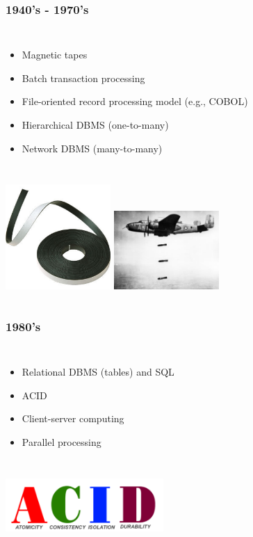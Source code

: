 \documentclass{beamer}
\begin{document}
\begin{frame}
\frametitle{1940's - 1970's}
\begin{columns}[c] 
\column{30em}
\begin{itemize}
  \justifying
  \item Magnetic tapes
  \item Batch transaction processing
  \item File-oriented record processing model (e.g., COBOL)
  \item Hierarchical DBMS (one-to-many)
  \item Network DBMS (many-to-many)
\end{itemize}
\end{columns}
\vspace{0.75cm}
\begin{columns}[c] 
\includegraphics[width=4cm]{figs/tape.pdf}
\hspace*{1cm}\includegraphics[width=4cm]{figs/bombers.pdf}
\end{columns}
\end{frame}

\begin{frame}
\frametitle{1980's}
\begin{columns}[c] 
\column{30em}
\begin{itemize}
  \justifying
  \item Relational DBMS (tables) and SQL
  \item ACID
  \item Client-server computing
  \item Parallel processing
\end{itemize}
\end{columns}
\vspace{0.75cm}
\hspace*{2.8cm}\includegraphics[width=6cm]{figs/acid.pdf}
\end{frame}
\end{document}
